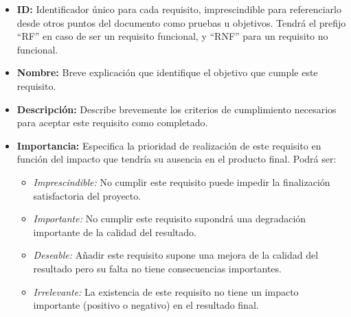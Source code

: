 \begin{itemize}
    \item \textbf{ID: } Identificador único para cada requisito, imprescindible para referenciarlo desde otros puntos del documento como pruebas u objetivos. Tendrá el prefijo ``RF'' en caso de ser un requisito funcional, y ``RNF'' para un requisito no funcional.
    \item \textbf{Nombre: } Breve explicación que identifique el objetivo que cumple este requisito.
    \item \textbf{Descripción: } Describe brevemente los criterios de cumplimiento necesarios para aceptar este requisito como completado.
    \item \textbf{Importancia: } Especifica la prioridad de realización de este requisito en función del impacto que tendría su ausencia en el producto final. Podrá ser:
    \begin{itemize}
        \item \textit{Imprescindible: } No cumplir este requisito puede impedir la finalización satisfactoria del proyecto.
        \item \textit{Importante: } No cumplir este requisito supondrá una degradación importante de la calidad del resultado.
        \item \textit{Deseable: } Añadir este requisito supone una mejora de la calidad del resultado pero su falta no tiene consecuencias importantes.
        \item \textit{Irrelevante: } La existencia de este requisito no tiene un impacto importante (positivo o negativo) en el resultado final.
    \end{itemize}
\end{itemize}




